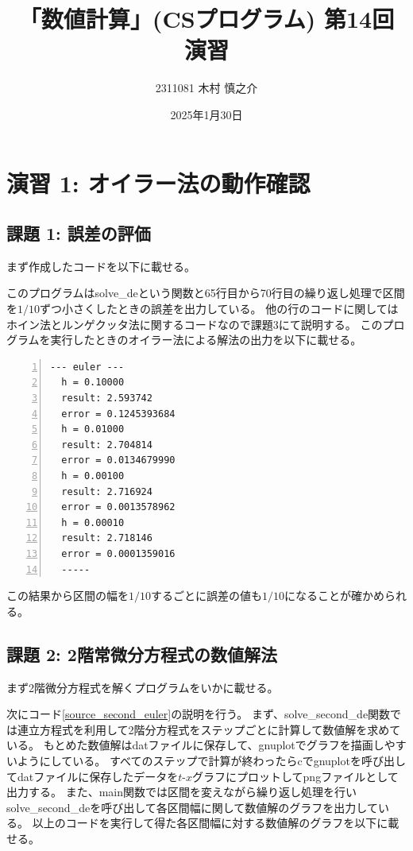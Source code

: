 \documentclass[a4paper]{jsarticle}
\title{「数値計算」(CSプログラム) 第14回 演習}
\author{2311081 木村 慎之介}
\date{2025年1月30日}
\begin{document}
\maketitle

\section*{演習 1: オイラー法の動作確認}
\subsection*{課題 1: 誤差の評価}
まず作成したコードを以下に載せる。

\hspace{1em}このプログラムはsolve\_deという関数と65行目から70行目の繰り返し処理で区間を\(1/10\)ずつ小さくしたときの誤差を出力している。
他の行のコードに関してはホイン法とルンゲクッタ法に関するコードなので課題3にて説明する。
このプログラムを実行したときのオイラー法による解法の出力を以下に載せる。

\begin{lstlisting}[caption={{\texttt{オイラー法による解法の誤差の出力}}}, numbers=left, label=soure_euler_result]
  --- euler ---
  h = 0.10000
  result: 2.593742
  error = 0.1245393684
  h = 0.01000
  result: 2.704814
  error = 0.0134679990
  h = 0.00100
  result: 2.716924
  error = 0.0013578962
  h = 0.00010
  result: 2.718146
  error = 0.0001359016
  -----
\end{lstlisting}

この結果から区間の幅を\(1/10\)するごとに誤差の値も\(1/10\)になることが確かめられる。
\subsection*{課題 2: 2階常微分方程式の数値解法}
まず2階微分方程式を解くプログラムをいかに載せる。

\hspace{1em}次にコード\ref{source_second_euler}の説明を行う。
まず、solve\_second\_de関数では連立方程式を利用して2階分方程式をステップごとに計算して数値解を求めている。
もとめた数値解はdatファイルに保存して、gnuplotでグラフを描画しやすいようにしている。
すべてのステップで計算が終わったらcでgnuplotを呼び出してdatファイルに保存したデータを\(t\)-\(x\)グラフにプロットしてpngファイルとして出力する。
また、main関数では区間を変えながら繰り返し処理を行いsolve\_second\_deを呼び出して各区間幅に関して数値解のグラフを出力している。
\hspace{1em}以上のコードを実行して得た各区間幅に対する数値解のグラフを以下に載せる。
\end{document}
